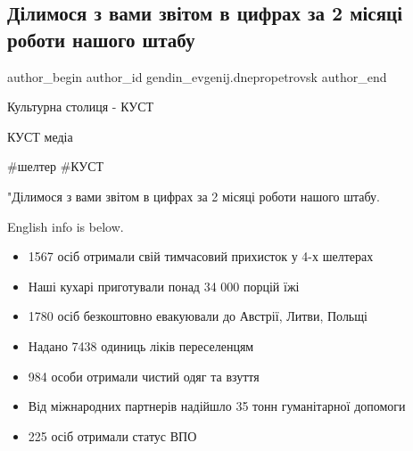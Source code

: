  
 
 
 
 
 
\subsection{Ділимося з вами звітом в цифрах за 2 місяці роботи нашого штабу}
\label{sec:02_05_2022.fb.gendin_evgenij.dnepropetrovsk.1.zvit}
 
\ifcmt
 author_begin
   author_id gendin_evgenij.dnepropetrovsk
 author_end
\fi

Культурна столиця - КУСТ 

КУСТ медіа 

\#шелтер \#КУСТ


"Ділимося з вами звітом в цифрах за 2 місяці роботи нашого штабу.

English info is below.

\begin{itemize}
  \item 1567 осіб отримали свій тимчасовий прихисток у 4-х шелтерах
  \item Наші кухарі приготували понад 34 000 порцій їжі
  \item 1780 осіб безкоштовно евакуювали до Австрії, Литви, Польщі
  \item Надано 7438 одиниць ліків переселенцям
  \item 984 особи отримали чистий одяг та взуття
  \item Від міжнародних партнерів надійшло 35 тонн гуманітарної допомоги
  \item 225 осіб отримали статус ВПО
\end{itemize}


